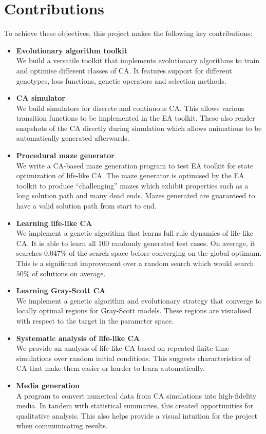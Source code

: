 \section{Contributions}
To achieve these objectives, this project makes the following key contributions:
\begin{itemize}
    \item \textbf{Evolutionary algorithm toolkit}\\ We build a versatile toolkit that implements evolutionary algorithms to train and optimise different classes of CA. It features support for different genotypes, loss functions, genetic operators and selection methods.
    \item \textbf{CA simulator}\\ We build simulators for discrete and continuous CA. This allows various transition functions to be implemented in the EA toolkit. These also render snapshots of the CA directly during simulation which allows animations to be automatically generated afterwards.
    \item \textbf{Procedural maze generator}\\ We write a CA-based maze generation program to test EA toolkit for state optimization of life-like CA. The maze generator is optimised by the EA toolkit to produce ``challenging'' mazes which exhibit properties such as a long solution path and many dead ends. Mazes generated are guaranteed to have a valid solution path from start to end.
    \item \textbf{Learning life-like CA}\\ We implement a genetic algorithm that learns full rule dynamics of life-like CA. It is able to learn all 100 randomly generated test cases. On average, it searches $0.047\%$ of the search space before converging on the global optimum. This is a significant improvement over a random search which would search $50\%$ of solutions on average.
    \item \textbf{Learning Gray-Scott CA}\\ We implement a genetic algorithm and evolutionary strategy that converge to locally optimal regions for Gray-Scott models. These regions are visualised with respect to the target in the parameter space.
    \item \textbf{Systematic analysis of life-like CA}\\ We provide an analysis of life-like CA based on repeated finite-time simulations over random initial conditions. This suggests characteristics of CA that make them easier or harder to learn automatically.
    \item \textbf{Media generation}\\ A program to convert numerical data from CA simulations into high-fidelity media. In tandem with statistical summaries, this created opportunities for qualitative analysis. This also helps provide a visual intuition for the project when communicating results.
\end{itemize}

